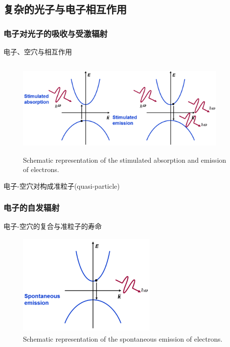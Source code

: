 \subsection{复杂的光子与电子相互作用}
\frame
{
	\frametitle{电子对光子的吸收与受激辐射}
电子、空穴与相互作用	
\begin{figure}[h!]
\centering
\vspace*{-0.2in}
\includegraphics[height=1.9in,width=4.1in,viewport=0 0 1500 600,clip]{Figures/Inter_band-transition_abs-emi.png}
\caption{\fontsize{5.2pt}{4.0pt}\selectfont\textrm{Schematic representation of the stimulated absorption and emission of electrons.}}%
\label{Stimulated-absorption-emission}
\end{figure} 
电子-空穴对构成准粒子\textrm{(quasi-particle)}
}

\frame
{
	\frametitle{电子的自发辐射}
	电子-空穴的复合与准粒子的寿命
\begin{figure}[h!]
\centering
\vspace*{-0.05in}
\includegraphics[height=2.0in,width=2.7in,viewport=0 0 830 620,clip]{Figures/Inter_band-transition_emission.png}
\caption{\fontsize{5.2pt}{4.0pt}\selectfont\textrm{Schematic representation of the spontaneous emission of electrons.}}%
\label{spontaneous-emission}
\end{figure} 
}

